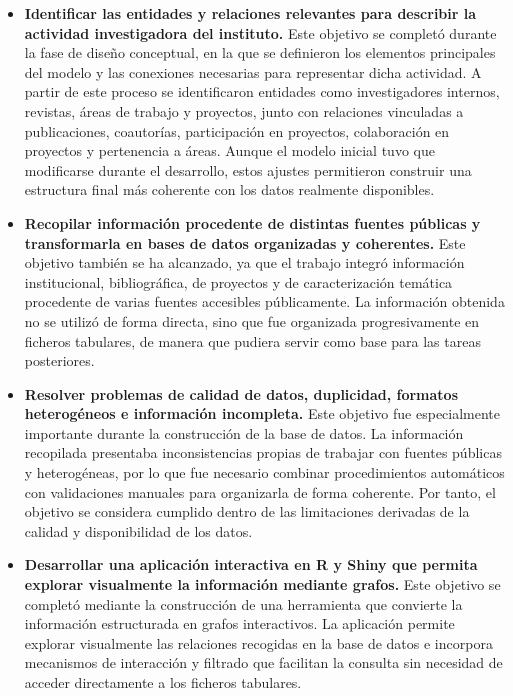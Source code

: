 \documentclass[11pt,spanish,listoffigures,listoftables]{tfgetsinf}
\begin{document}
\begin{itemize}
    \item \textbf{Identificar las entidades y relaciones relevantes para describir la actividad investigadora del instituto.} Este objetivo se completó durante la fase de diseño conceptual, en la que se definieron los elementos principales del modelo y las conexiones necesarias para representar dicha actividad. A partir de este proceso se identificaron entidades como investigadores internos, revistas, áreas de trabajo y proyectos, junto con relaciones vinculadas a publicaciones, coautorías, participación en proyectos, colaboración en proyectos y pertenencia a áreas. Aunque el modelo inicial tuvo que modificarse durante el desarrollo, estos ajustes permitieron construir una estructura final más coherente con los datos realmente disponibles.

    \item \textbf{Recopilar información procedente de distintas fuentes públicas y transformarla en bases de datos organizadas y coherentes.} Este objetivo también se ha alcanzado, ya que el trabajo integró información institucional, bibliográfica, de proyectos y de caracterización temática procedente de varias fuentes accesibles públicamente. La información obtenida no se utilizó de forma directa, sino que fue organizada progresivamente en ficheros tabulares, de manera que pudiera servir como base para las tareas posteriores.

    \item \textbf{Resolver problemas de calidad de datos, duplicidad, formatos heterogéneos e información incompleta.} Este objetivo fue especialmente importante durante la construcción de la base de datos. La información recopilada presentaba inconsistencias propias de trabajar con fuentes públicas y heterogéneas, por lo que fue necesario combinar procedimientos automáticos con validaciones manuales para organizarla de forma coherente. Por tanto, el objetivo se considera cumplido dentro de las limitaciones derivadas de la calidad y disponibilidad de los datos.

    \item \textbf{Desarrollar una aplicación interactiva en R y Shiny que permita explorar visualmente la información mediante grafos.} Este objetivo se completó mediante la construcción de una herramienta que convierte la información estructurada en grafos interactivos. La aplicación permite explorar visualmente las relaciones recogidas en la base de datos e incorpora mecanismos de interacción y filtrado que facilitan la consulta sin necesidad de acceder directamente a los ficheros tabulares.


\end{itemize}
\end{document}
